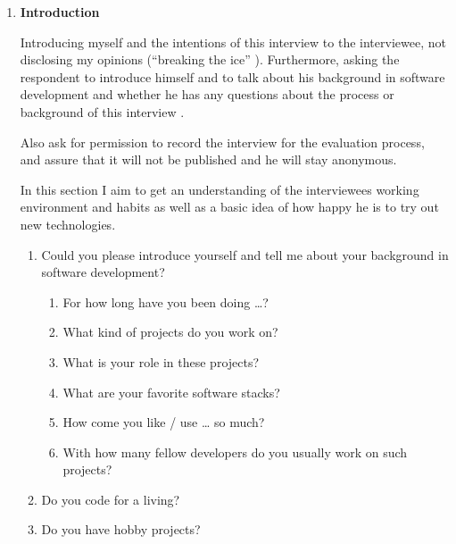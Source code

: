 \begin{enumerate}

	\item \textbf{Introduction}

	Introducing myself and the intentions of this interview to the interviewee, not disclosing my opinions (\enquote{breaking the ice} \cite[p. 83]{berg01}). Furthermore, asking the respondent to introduce himself and to talk about his background in software development and whether he has any questions about the process or background of this interview \cite[p. 83]{berg01}.

	Also ask for permission to record the interview for the evaluation process, and assure that it will not be published and he will stay anonymous.

	In this section I aim to get an understanding of the interviewees working environment and habits as well as a basic idea of how happy he is to try out new technologies.

	\begin{enumerate}

		\item Could you please introduce yourself and tell me about your background in software development?

		\begin{enumerate}

			\item For how long have you been doing …?

			\item What kind of projects do you work on?

			\item What is your role in these projects?

			\item What are your favorite software stacks?

			\item How come you like / use … so much?

			\item With how many fellow developers do you usually work on such projects?

		\end{enumerate}

		\item Do you code for a living?

		\item Do you have hobby projects?

	\end{enumerate}


\end{enumerate}
